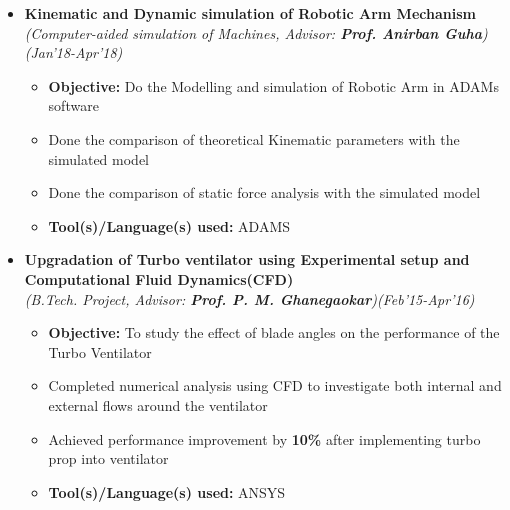 \documentclass[a4paper,10pt]{article}
\begin{document}
\begin{itemize}
\item \textbf{Kinematic and Dynamic simulation of Robotic Arm Mechanism} \\
\emph{(Computer-aided simulation of Machines, Advisor: \textbf{Prof. Anirban Guha})\hfill (Jan’18-Apr'18)} \\[-0.4cm]
	\begin{itemize}[noitemsep,nolistsep]
    \item \textbf{Objective:} Do the Modelling and simulation of Robotic Arm in ADAMs software
    \item Done the comparison of theoretical Kinematic parameters with the simulated model
    \item Done the comparison of static force analysis with the simulated model
    \item \textbf{Tool(s)/Language(s) used:} ADAMS
	\end{itemize}

\item \textbf{Upgradation of Turbo ventilator using Experimental setup and Computational Fluid Dynamics(CFD)} \\
\emph{(B.Tech. Project, Advisor: \textbf{Prof. P. M. Ghanegaokar})\hfill (Feb'15-Apr'16)} \\[-0.4cm]
	\begin{itemize}[noitemsep,nolistsep]
    \item \textbf{Objective:} To study the effect of blade angles on the performance of the Turbo Ventilator
    \item Completed numerical analysis using CFD to investigate both internal and external flows around the ventilator
        \item Achieved performance improvement by \textbf{10\%} after implementing turbo prop into ventilator 
    \item \textbf{Tool(s)/Language(s) used:} ANSYS
	\end{itemize}
\end{itemize}
\end{document}
